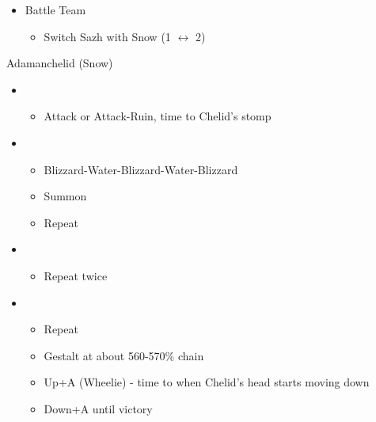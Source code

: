 \begin{menu}
	\begin{itemize}
			      \paradigm
			      \begin{itemize}
				      \item Battle Team
				            \begin{itemize}
					            \item Switch Sazh with Snow (1 $\leftrightarrow$ 2)
				            \end{itemize}
			      \end{itemize}
	\end{itemize}
\end{menu}

\begin{battle}[0:54]{Adamanchelid (Snow)}
	\begin{itemize}
		\item \first
		      \begin{itemize}
			      \item Attack or Attack-Ruin, time to Chelid's stomp
		      \end{itemize}
		\item \sixth
		      \begin{itemize}
			      \item Blizzard-Water-Blizzard-Water-Blizzard
			      \item Summon
			      \item Repeat
		      \end{itemize}
		\item \fifth
			\begin{itemize}
				\item Repeat twice
			\end{itemize}
		\item \sixth
			\begin{itemize}
				\item Repeat
				\item Gestalt at about 560-570\% chain
				\item Up+A (Wheelie) - time to when Chelid's head starts moving down
				\item Down+A until victory
			\end{itemize}
	\end{itemize}
\end{battle}